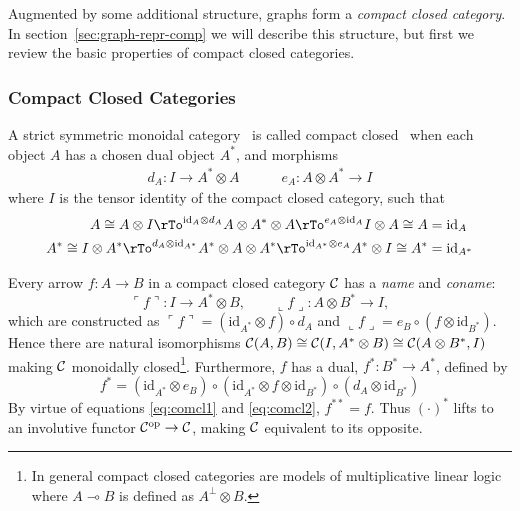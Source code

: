 \documentclass[runningheads]{llncs}
\newcommand{\iso}{\cong}
\newcommand{\name}[1]{%
\ulcorner #1 \urcorner}
\newcommand{\coname}[1]{%
\llcorner #1 \lrcorner}
\newcommand{\catC}{\ensuremath{{\cal C}}\xspace}
\newcommand{\id}[1]{\ensuremath{\mathrm{id}_{#1}}}
\begin{document}
Augmented by some additional structure, graphs form a \emph{compact closed
category}.  In section~\ref{sec:graph-repr-comp} we will describe this
structure, but first we review the basic properties of compact closed
categories.

\subsubsection*{Compact Closed Categories}

\begin{definition}
\label{compactcat-def}
A strict symmetric monoidal category~\cite{AspLon:CatTypStruct:1991}
is called compact closed~\cite{KelLap:comcl:1980} when each object $A$
has a chosen dual object $A^*$, and morphisms
\begin{gather*}
  d_A : I \to A^* \otimes A \quad\quad\quad e_A : A \otimes A^* \to I
\end{gather*}
where $I$ is the tensor identity of the compact closed category, such
that
\begin{align}
  A \iso A \otimes I \rTo^{\id{A} \otimes d_A} A \otimes A^* \otimes A
  \rTo^{e_A \otimes \id{A}} I \otimes A \iso A & = \id{A} \label{eq:comcl1}\\
  A^* \iso I \otimes A^* \rTo^{ d_A \otimes \id{A^*}} A^* \otimes A
  \otimes A^* \rTo^{\id{A^*} \otimes e_A} A^* \otimes I \iso A^* & =
  \id{A^*} \label{eq:comcl2}
\end{align}
\end{definition}

Every arrow $f:A\to B$ in a compact closed category \catC
has a \emph{name} and \emph{coname}:
\[
\name{f} : I \to A^* \otimes B, \qquad \coname{f} : A \otimes  B^* \to I,
\]
which are constructed as $\name{f} = (\id{A^*}\otimes f) \circ d_A$ and
$\coname{f} = e_B \circ (f \otimes \id{B^*})$.  Hence there are natural
isomorphisms $\catC(A,B) \iso \catC(I,A^*\otimes B) \iso
\catC(A\otimes B^*,I)$ making \catC monoidally closed\footnote{In
  general compact closed categories  are models of multiplicative
  linear logic where $A \multimap B$ is defined as $A^\bot \otimes B$.}.
Furthermore,  $f$ has a dual, $f^* : B^* \to A^*$, defined by 
\[
f^* = (\id{A^*} \otimes e_B) \circ (\id{A^*}\otimes f \otimes
\id{B^*}) \circ (d_A \otimes \id{B^*})
\]
By virtue of equations \eqref{eq:comcl1} and \eqref{eq:comcl2}, $f^{**} =
f$.  Thus $(\cdot)^*$ lifts to an involutive functor
$\catC^{\text{op}} \to \catC$,  making $\catC$ equivalent to its
opposite.
\end{document}
